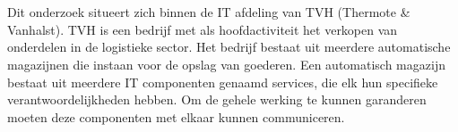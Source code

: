 
%
%
%
%
%

%



\chapter*{}


Dit onderzoek situeert zich binnen de IT afdeling van TVH (Thermote \& Vanhalst). 
TVH is een bedrijf met als hoofdactiviteit het verkopen van onderdelen in de logistieke sector.
Het bedrijf bestaat uit meerdere automatische magazijnen die instaan voor de opslag van goederen. 
Een automatisch magazijn bestaat uit meerdere IT componenten genaamd services, die elk hun specifieke verantwoordelijkheden hebben. 
Om de gehele werking te kunnen garanderen moeten deze componenten met elkaar kunnen communiceren. 
\newline

